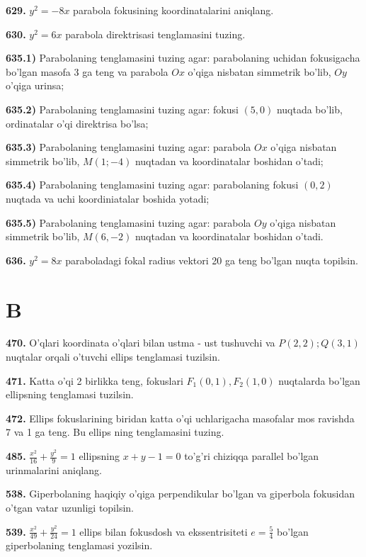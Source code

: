 \textbf{629.} \(y^{2} = - 8x\) parabola fokusining koordinatalarini aniqlang.

\textbf{630.} \(y^{2} = 6x\) parabola direktrisasi tenglamasini tuzing.

\textbf{635.1)} Parabolaning tenglamasini tuzing agar: parabolaning uchidan fokusigacha bo'lgan masofa 3 ga teng va parabola \(Ox\) o'qiga nisbatan simmetrik bo'lib, \(Oy\) o'qiga urinsa;

\textbf{635.2)} Parabolaning tenglamasini tuzing agar: fokusi \((5,0)\) nuqtada bo'lib, ordinatalar o'qi direktrisa bo'lsa;

\textbf{635.3)} Parabolaning tenglamasini tuzing agar: parabola \(Ox\) o'qiga nisbatan simmetrik bo'lib, \(M(1; - 4)\) nuqtadan va koordinatalar boshidan o'tadi;

\textbf{635.4)} Parabolaning tenglamasini tuzing agar: parabolaning fokusi \((0,2)\) nuqtada va uchi koordiniatalar boshida yotadi;

\textbf{635.5)} Parabolaning tenglamasini tuzing agar: parabola \(Oy\) o'qiga nisbatan simmetrik bo'lib, \(M(6, - 2)\) nuqtadan va koordinatalar boshidan o'tadi.

\textbf{636.} \(y^{2} = 8x\) paraboladagi fokal radius vektori 20 ga teng bo'lgan nuqta topilsin.

\section{B}\label{b}

\textbf{470.} O'qlari koordinata o'qlari bilan ustma - ust tushuvchi va \(P(2,2);Q(3,1)\) nuqtalar orqali o'tuvchi ellips tenglamasi tuzilsin.

\textbf{471.} Katta o'qi 2 birlikka teng, fokuslari \(F_{1}(0,1),F_{2}(1,0)\) nuqtalarda bo'lgan ellipsning tenglamasi tuzilsin.

\textbf{472.} Ellips fokuslarining biridan katta o'qi uchlarigacha masofalar mos ravishda 7 va 1 ga teng. Bu ellips ning tenglamasini tuzing.

\textbf{485.} \(\frac{x^{2}}{16} + \frac{y^{2}}{9} = 1\) ellipsning \(x + y - 1 = 0\) to'g'ri chiziqqa parallel bo'lgan urinmalarini aniqlang.

\textbf{538.} Giperbolaning haqiqiy o'qiga perpendikular bo'lgan va giperbola fokusidan o'tgan vatar uzunligi topilsin.

\textbf{539.} \(\frac{x^{2}}{49} + \frac{y^{2}}{24} = 1\) ellips bilan fokusdosh va ekssentrisiteti \(e = \frac{5}{4}\) bo'lgan giperbolaning tenglamasi yozilsin.

